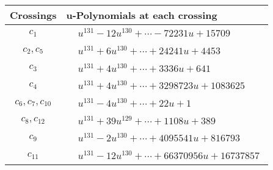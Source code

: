 \documentclass[1p]{elsarticle_modified}
\theoremstyle{definition}
\begin{document}
\begin{tabular}{m{50pt}|m{274pt}}
Crossings & \hspace{64pt}u-Polynomials at each crossing \\
\hline $$\begin{aligned}c_{1}\end{aligned}$$&$\begin{aligned}
&u^{131}-12 u^{130}+\cdots-72231 u+15709
\end{aligned}$\\
\hline $$\begin{aligned}c_{2},c_{5}\end{aligned}$$&$\begin{aligned}
&u^{131}+6 u^{130}+\cdots+24241 u+4453
\end{aligned}$\\
\hline $$\begin{aligned}c_{3}\end{aligned}$$&$\begin{aligned}
&u^{131}+4 u^{130}+\cdots+3336 u+641
\end{aligned}$\\
\hline $$\begin{aligned}c_{4}\end{aligned}$$&$\begin{aligned}
&u^{131}+4 u^{130}+\cdots+3298723 u+1083625
\end{aligned}$\\
\hline $$\begin{aligned}c_{6},c_{7},c_{10}\end{aligned}$$&$\begin{aligned}
&u^{131}-4 u^{130}+\cdots+22 u+1
\end{aligned}$\\
\hline $$\begin{aligned}c_{8},c_{12}\end{aligned}$$&$\begin{aligned}
&u^{131}+39 u^{129}+\cdots+1108 u+389
\end{aligned}$\\
\hline $$\begin{aligned}c_{9}\end{aligned}$$&$\begin{aligned}
&u^{131}-2 u^{130}+\cdots+4095541 u+816793
\end{aligned}$\\
\hline $$\begin{aligned}c_{11}\end{aligned}$$&$\begin{aligned}
&u^{131}-12 u^{130}+\cdots+66370956 u+16737857
\end{aligned}$\\
\hline
\end{tabular}\\~\\
\end{document}
